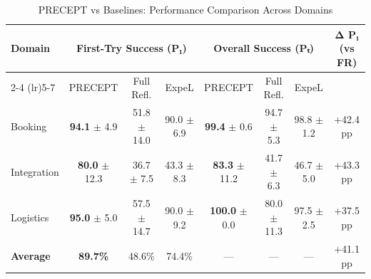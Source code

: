 \begin{table}[t]
\centering
\caption{PRECEPT vs Baselines: Performance Comparison Across Domains}
\label{tab:main_comparison}
\begin{tabular}{lccccccc}
\toprule
Domain & \multicolumn{3}{c}{First-Try Success (P₁)} & \multicolumn{3}{c}{Overall Success (Pₜ)} & Δ P₁ (vs FR) \\
\cmidrule(lr){2-4} \cmidrule(lr){5-7}
 & PRECEPT & Full Refl. & ExpeL & PRECEPT & Full Refl. & ExpeL & \\
\midrule
Booking & \textbf{94.1} $\pm$ 4.9 & 51.8 $\pm$ 14.0 & 90.0 $\pm$ 6.9 & \textbf{99.4} $\pm$ 0.6 & 94.7 $\pm$ 5.3 & 98.8 $\pm$ 1.2 & +42.4 pp \\
Integration & \textbf{80.0} $\pm$ 12.3 & 36.7 $\pm$ 7.5 & 43.3 $\pm$ 8.3 & \textbf{83.3} $\pm$ 11.2 & 41.7 $\pm$ 6.3 & 46.7 $\pm$ 5.0 & +43.3 pp \\
Logistics & \textbf{95.0} $\pm$ 5.0 & 57.5 $\pm$ 14.7 & 90.0 $\pm$ 9.2 & \textbf{100.0} $\pm$ 0.0 & 80.0 $\pm$ 11.3 & 97.5 $\pm$ 2.5 & +37.5 pp \\
\midrule
\textbf{Average} & \textbf{89.7\%} & 48.6\% & 74.4\% & — & — & — & +41.1 pp \\
\bottomrule
\end{tabular}
\end{table}